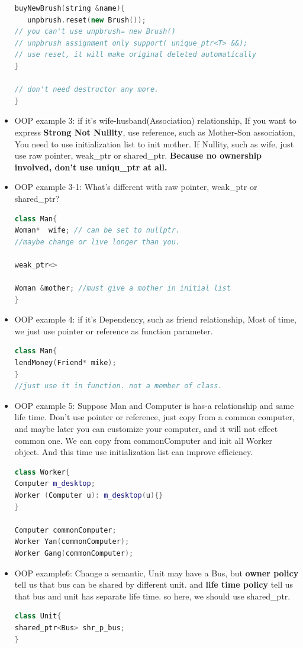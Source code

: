 \documentclass[a4paper,12pt,twoside]{book}
\begin{document}
\begin{itemize}
\begin{lstlisting}[frame=single, language=c++]
buyNewBrush(string &name){
   unpbrush.reset(new Brush());
// you can't use unpbrush= new Brush()
// unpbrush assignment only support( unique_ptr<T> &&);
// use reset, it will make original deleted automatically
}

// don't need destructor any more.
}
\end{lstlisting}

\item OOP example 3: if it's wife-husband(Association) relationship, If you want to express \textbf{Strong Not Nullity}, use reference, such as Mother-Son association, You need to use initialization list to init mother. If Nullity, such as wife, just use raw pointer, weak\_ptr or shared\_ptr. \textbf{Because no ownership involved, don't use uniqu\_ptr at all. }

\item OOP example 3-1: What's different with raw pointer, weak\_ptr or shared\_ptr?
\begin{lstlisting}[frame=single, language=c++]
class Man{
Woman*  wife; // can be set to nullptr.
//maybe change or live longer than you.

weak_ptr<>

Woman &mother; //must give a mother in initial list
}

\end{lstlisting}

\item OOP example 4: if it's Dependency,  such as friend relationship,  Most of time, we just use pointer or reference as function parameter.
\begin{lstlisting}[frame=single, language=c++]
class Man{
lendMoney(Friend* mike);
}
//just use it in function. not a member of class.
\end{lstlisting}

\item OOP example 5: Suppose Man and Computer is has-a relationship and same life time. Don't use pointer or reference, just copy from a common computer, and maybe later you can customize your computer, and it will not effect common one.  We can copy from commonComputer and init all Worker object.  And this time use initialization list can improve efficiency.
\begin{lstlisting}[frame=single, language=c++]
class Worker{
Computer m_desktop;
Worker (Computer u): m_desktop(u){}
}

Computer commonComputer;
Worker Yan(commonComputer);
Worker Gang(commonComputer);
\end{lstlisting}


\item OOP example6:  Change a semantic,  Unit may have a Bus, but \textbf{owner policy} tell us that bus can be shared by different unit. and \textbf{life time policy} tell us that bus and unit has separate life time. so here, we should use shared\_ptr.
\begin{lstlisting}[frame=single, language=c++]
class Unit{
shared_ptr<Bus> shr_p_bus;
}
\end{lstlisting}

\end{itemize}
\end{document}

